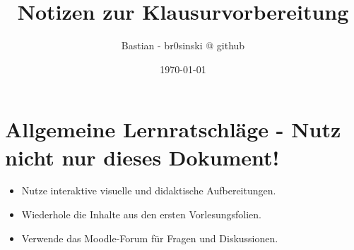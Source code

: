 \documentclass[a4paper,12pt]{article}
\title{Notizen zur Klausurvorbereitung}
\author{Bastian - br0sinski @ github}
\date{\today}
\begin{document}
\maketitle

\tableofcontents

\section{Allgemeine Lernratschläge - Nutz nicht nur dieses Dokument!}
\begin{itemize}
    \item Nutze interaktive visuelle und didaktische Aufbereitungen.
    \item Wiederhole die Inhalte aus den ersten Vorlesungsfolien.
    \item Verwende das Moodle-Forum für Fragen und Diskussionen.
\end{itemize}

\pagebreak
\end{document}
